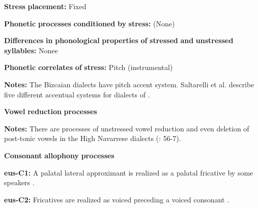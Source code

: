 \documentclass[output=paper]{langsci/langscibook}
\begin{document}
\begin{styleBody}
\textbf{Stress} \textbf{placement:} Fixed
\end{styleBody}

\begin{styleBody}
\textbf{Phonetic} \textbf{processes} \textbf{conditioned} \textbf{by} \textbf{stress:} (None)
\end{styleBody}

\begin{styleBody}
\textbf{Differences} \textbf{in} \textbf{phonological} \textbf{properties} \textbf{of} \textbf{stressed} \textbf{and} \textbf{unstressed} \textbf{syllables:} Nonee
\end{styleBody}

\begin{styleBody}
\textbf{Phonetic} \textbf{correlates} \textbf{of} \textbf{stress:} Pitch (instrumental)
\end{styleBody}

\begin{styleBody}
\textbf{Notes:} The Bizcaian dialects have pitch accent system. Saltarelli et al. describe five different accentual systems for dialects of \citet[282-3]{Basque1988}.
\end{styleBody}

\begin{styleBody}
\textbf{Vowel} \textbf{reduction} \textbf{processes}
\end{styleBody}

\begin{styleBody}
\textbf{Notes:} There are processes of unstressed vowel reduction and even deletion of post-tonic vowels in the High Navarrese dialects (\citealt{HualdeUrbina2003}: 56-7).
\end{styleBody}

\begin{styleBody}
\textbf{Consonant} \textbf{allophony} \textbf{processes}
\end{styleBody}

\begin{styleBody}
\textbf{eus-C1:} A palatal lateral approximant is realized as a palatal fricative by some speakers \citep[29]{Hualde2003}.
\end{styleBody}

\begin{styleBody}
\textbf{eus-C2:} Fricatives are realized as voiced preceding a voiced consonant \citep[24]{Hualde2003}.
\end{styleBody}
\end{document}
